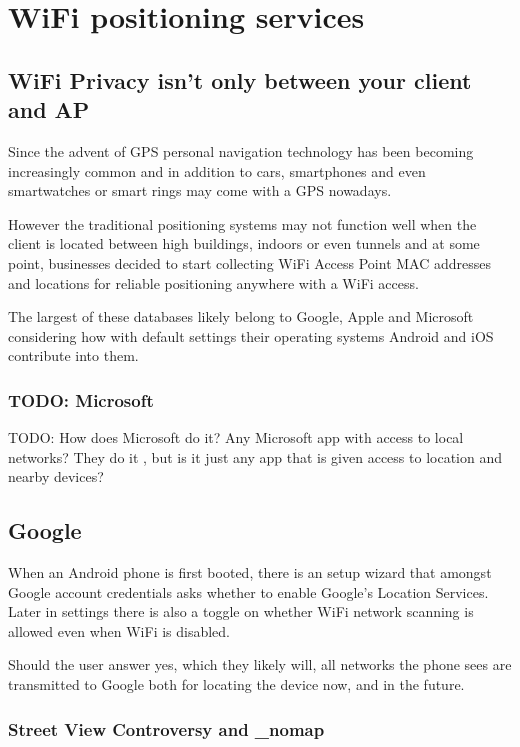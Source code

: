 \documentclass[../wifi-security.tex]{subfiles}
\begin{document}
\chapter{WiFi positioning services}

\section{WiFi Privacy isn't only between your client and AP}

Since the advent of GPS personal navigation technology has been becoming increasingly common and in addition to cars, smartphones and even smartwatches or smart rings may come with a GPS nowadays.

However the traditional positioning systems may not function well when the client is located between high buildings, indoors or even tunnels and at some point, businesses decided to start collecting WiFi Access Point MAC addresses and locations for reliable positioning anywhere with a WiFi access.

The largest of these databases likely belong to Google, Apple and Microsoft considering how with default settings their operating systems Android and iOS contribute into them.

\subsection{TODO: Microsoft}

TODO: How does Microsoft do it? Any Microsoft app with access to local networks? They do it \autocite{Microsoft_nomap}, but is it just any app that is given access to location and nearby devices?

\section{Google}

When an Android phone is first booted, there is an setup wizard that amongst Google account credentials asks whether to enable Google's Location Services. Later in settings there is also a toggle on whether WiFi network scanning is allowed even when WiFi is disabled.

Should the user answer yes, which they likely will, all networks the phone sees are transmitted to Google both for locating the device now, and in the future.

\subsection{Street View Controversy and \_nomap}
\end{document}
